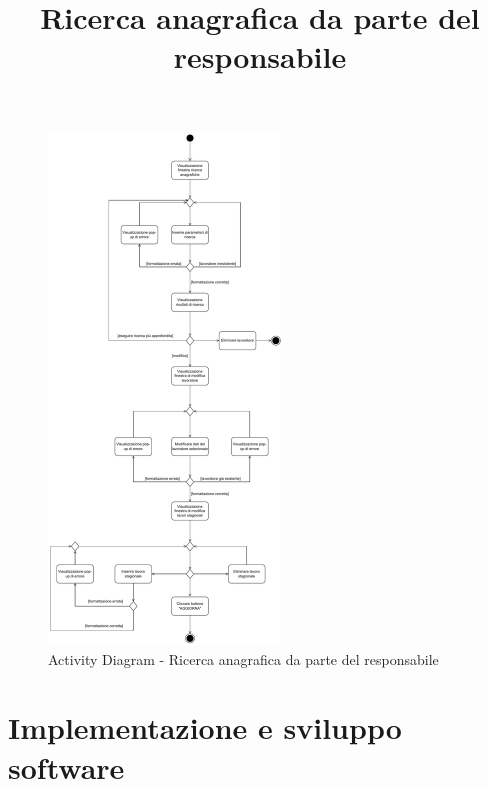 \documentclass[a4paper,11pt]{article}
\begin{document}
\begin{center}
	\title{\textbf{Ricerca anagrafica da parte del responsabile}}
	\maketitle
\end{center}
\begin{figure}[htpb]
	\centering
	\includegraphics[width=0.55\textwidth]{diagrams/Activity_Diagram_-_Ricerca_anagrafiche.pdf}
	\caption{Activity Diagram - Ricerca anagrafica da parte del responsabile}
	\label{fig:act_dia_ric_ana}
\end{figure}


\newpage
\section{Implementazione e sviluppo software}
\label{sec:imp_svil}
\end{document}
